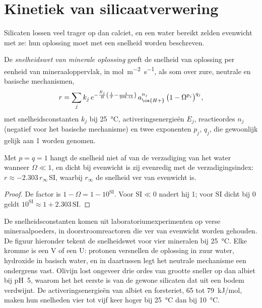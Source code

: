 \section{Kinetiek van silicaatverwering}\label{sec:b3:water-rock-interaction:kinetics}

Silicaten lossen veel trager op dan calciet, en een water bereikt zelden
evenwicht met ze: hun oplossing moet met een snelheid worden beschreven.

\begin{definition}\label{def:b3:water-rock-interaction:rate-law}
De \emph{snelheidswet van minerale oplossing}
geeft de snelheid van oplossing per eenheid van mineraaloppervlak, in
\unit{mol.m^{-2}.s^{-1}}, als som over zure, neutrale en basische mechanismen,
\[
r = \sum_j k_j\,e^{-\frac{E_j}{R}\left(\frac1T - \frac1{298.15}\right)}\,
a_{\ce{H+}}^{n_j}\,\bigl(1 - \Omega^{p_j}\bigr)^{q_j},
\]
met snelheidsconstanten $k_j$ bij \qty{25}{\celsius}, activeringsenergieën $E_j$,
reactieordes $n_j$ (negatief voor het basische mechanisme) en twee exponenten
$p_j$, $q_j$, die gewoonlijk gelijk aan 1 worden genomen.
\end{definition}

\begin{proposition}\label{prop:b3:water-rock-interaction:affinity}
Met $p = q = 1$ hangt de snelheid niet af van de verzadiging van het water
wanneer $\Omega \ll 1$, en dicht bij evenwicht is zij evenredig met de
verzadigingsindex: $r \approx -2.303\,r_\infty\,\mathrm{SI}$, waarbij
$r_\infty$ de snelheid ver van evenwicht is.
\end{proposition}

\begin{proof}
De factor is $1 - \Omega = 1 - 10^{\mathrm{SI}}$. Voor $\mathrm{SI} \ll 0$ nadert
hij 1; voor $\mathrm{SI}$ dicht bij 0 geldt $10^{\mathrm{SI}} \approx 1 +
2.303\,\mathrm{SI}$.
\end{proof}

De snelheidsconstanten komen uit laboratoriumexperimenten op verse mineraalpoeders,
in doorstroomreactoren die ver van evenwicht worden gehouden. De figuur hieronder tekent
de snelheidswet voor vier mineralen bij \qty{25}{\celsius}. Elke kromme is een V of een
U: protonen versnellen de oplossing in zuur water, hydroxide in basisch water, en in
daartussen legt het neutrale mechanisme een ondergrens vast. Olivijn lost ongeveer drie
ordes van grootte sneller op dan albiet bij pH~5, waarom het het eerste is van
de gewone silicaten dat uit een bodem verdwijnt. De activeringsenergieën van
albiet en forsteriet, 65 tot \qty{79}{kJ/mol}, maken hun snelheden vier tot vijf
keer hoger bij \qty{25}{\celsius} dan bij \qty{10}{\celsius}.

